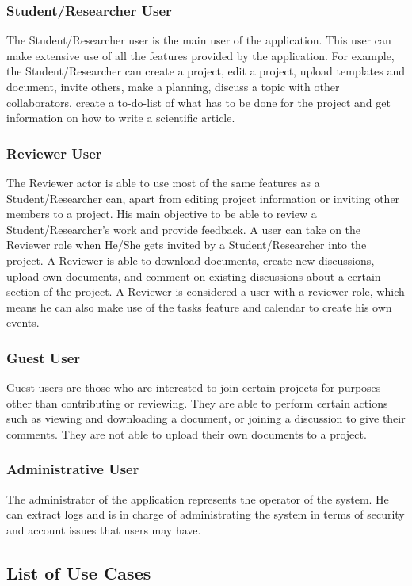 \subsubsection{Student/Researcher User} 
The Student/Researcher user is the main user of the application. This user can make extensive use of all the features provided by the application. 
For example, the Student/Researcher can create a project, edit a project, upload templates and document, invite others, make a planning, discuss a 
topic with other collaborators, create a to-do-list of what has to be done for the project and get information on how to write a scientific article.

\subsubsection{Reviewer User} 
The Reviewer actor is able to use most of the same features as a Student/Researcher can, apart from editing project information or inviting other 
members to a project. His main objective to be able to review a Student/Researcher's work and provide feedback. A user can take on the Reviewer role 
when He/She gets invited by a Student/Researcher into the project. A Reviewer is able to download documents, create new discussions, upload own 
documents, and comment on existing discussions about a certain section of the project. A Reviewer is considered a user with a reviewer role, which 
means he can also make use of the tasks feature and calendar to create his own events.

\subsubsection{Guest User} 
Guest users are those who are interested to join certain projects for purposes other than contributing or reviewing. They are able to perform certain
actions such as viewing and downloading a document, or joining a discussion to give their comments. They are not able to upload their own documents to 
a project.

\subsubsection{Administrative User} 
The administrator of the application represents the operator of the system. He can extract logs and is in charge of administrating the system in terms of security and account issues that users may have.

\subsection{List of Use Cases} %
\label{sub:list_of_use_cases}
